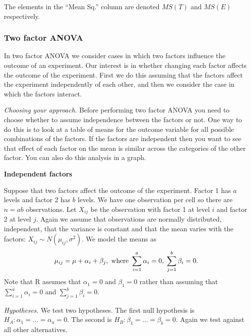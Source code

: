 \documentclass[10pt, two column]{article}
\begin{document}
The elements in the ``Mean Sq.'' column are denoted $MS(T)$ and $MS(E)$ respectively. 

\subsubsection{Two factor ANOVA}

In two factor ANOVA we consider cases in which two factors influence the outcome of an experiment. Our interest is in whether changing each factor affects the outcome of the experiment. First we do this assuming that the factors affect the experiment independently of each other, and then we consider the case in which the factors interact. 

\emph{Choosing your approach.} Before performing two factor ANOVA you need to choose whether to assume independence between the factors or not. One way to do this is to look at a table of means for the outcome variable for all possible combinations of the factors. If the factors are independent then you want to see that effect of each factor on  the mean is similar across the categories of the other factor. You can also do this analysis in a graph. 

{\bf Independent factors}

Suppose that two factors affect the outcome of the experiment. Factor 1 has $a$ levels and factor 2 has $b$ levels. We have one observation per cell so there are $n =ab$ observations. Let $X_{ij}$ be the observation with factor 1 at level $i$ and factor 2 at level $j$. Again we assume that observations are normally distributed, independent, that the variance is constant and that the mean varies with the factors: $X_{ij} \sim N(\mu_{ij}, \sigma^{2})$. We model the means as \vspace{-5pt}
\[
\mu_{ij} = \mu + \alpha_{i} + \beta_{j}, \text{ where } \sum_{i=1}^{a} \alpha_{i} = 0, \; \sum_{j=1}^{b} \beta_{i} = 0. \vspace{-5pt}
\]
Note that R assumes that $\alpha_{1} = 0$ and $\beta_{1} = 0$ rather than assuming that $\sum_{i=1}^{a} \alpha_{i} = 0$ and $\sum_{j=1}^{b} \beta_{i} = 0$. 

\emph{Hypotheses.} We test two hypotheses. The first null hypothesis is $H_{A}: \alpha_{1} = \dots = \alpha_{a} = 0$. The second is $H_{B}: \beta_{1} = \dots = \beta_{b} = 0$. Again we test against all other alternatives.  
\end{document}
